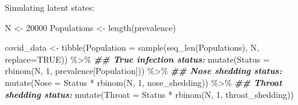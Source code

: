 \documentclass[
  ignorenonframetext,
  aspectratio=169,
]{beamer}
\newenvironment{Shaded}{\begin{snugshade}}{\end{snugshade}}
\newcommand{\AttributeTok}[1]{\textcolor[rgb]{0.77,0.63,0.00}{#1}}
\newcommand{\ConstantTok}[1]{\textcolor[rgb]{0.00,0.00,0.00}{#1}}
\newcommand{\DecValTok}[1]{\textcolor[rgb]{0.00,0.00,0.81}{#1}}
\newcommand{\DocumentationTok}[1]{\textcolor[rgb]{0.56,0.35,0.01}{\textbf{\textit{#1}}}}
\newcommand{\FunctionTok}[1]{\textcolor[rgb]{0.00,0.00,0.00}{#1}}
\newcommand{\NormalTok}[1]{#1}
\newcommand{\OtherTok}[1]{\textcolor[rgb]{0.56,0.35,0.01}{#1}}
\newcommand{\SpecialCharTok}[1]{\textcolor[rgb]{0.00,0.00,0.00}{#1}}
\begin{document}
\begin{frame}[fragile]
Simulating latent states:

\scriptsize

\begin{Shaded}
\begin{Highlighting}[]
\NormalTok{N }\OtherTok{\textless{}{-}} \DecValTok{20000}
\NormalTok{Populations }\OtherTok{\textless{}{-}} \FunctionTok{length}\NormalTok{(prevalence)}

\NormalTok{covid\_data }\OtherTok{\textless{}{-}} \FunctionTok{tibble}\NormalTok{(}\AttributeTok{Population =} \FunctionTok{sample}\NormalTok{(}\FunctionTok{seq\_len}\NormalTok{(Populations), N, }\AttributeTok{replace=}\ConstantTok{TRUE}\NormalTok{)) }\SpecialCharTok{\%\textgreater{}\%}
  \DocumentationTok{\#\# True infection status:}
  \FunctionTok{mutate}\NormalTok{(}\AttributeTok{Status =} \FunctionTok{rbinom}\NormalTok{(N, }\DecValTok{1}\NormalTok{, prevalence[Population])) }\SpecialCharTok{\%\textgreater{}\%}
  \DocumentationTok{\#\# Nose shedding status:}
  \FunctionTok{mutate}\NormalTok{(}\AttributeTok{Nose =}\NormalTok{ Status }\SpecialCharTok{*} \FunctionTok{rbinom}\NormalTok{(N, }\DecValTok{1}\NormalTok{, nose\_shedding)) }\SpecialCharTok{\%\textgreater{}\%}
  \DocumentationTok{\#\# Throat shedding status:}
  \FunctionTok{mutate}\NormalTok{(}\AttributeTok{Throat =}\NormalTok{ Status }\SpecialCharTok{*} \FunctionTok{rbinom}\NormalTok{(N, }\DecValTok{1}\NormalTok{, throat\_shedding))}
\end{Highlighting}
\end{Shaded}

\normalsize
\end{frame}
\end{document}
